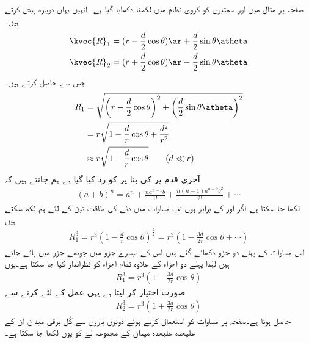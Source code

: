 صفحہ  پر مثال  میں  اور
  سمتیوں کو کروی نظام میں لکھنا دکھایا گیا ہے۔ انہیں یہاں دوبارہ پیش کرتے ہیں۔
\begin{align*}
\kvec{R}_1 &=(r-\frac{d}{2}\cos\theta)\ar+\frac{d}{2}\sin\theta \atheta\\
\kvec{R}_2 &=(r+\frac{d}{2}\cos \theta )\ar-\frac{d}{2}\sin \theta \atheta
\end{align*}
جس سے  حاصل کرتے ہیں۔
\begin{gather}
\begin{aligned}\label{مساوات_توانائی_جفت_قطب_فاصلے}
R_1&=\sqrt{\left(r-\frac{d}{2}\cos\theta\right)^2+\left(\frac{d}{2}\sin\theta \atheta \right)^2}\\
&=r \sqrt{1-\frac{d}{r} \cos \theta +\frac{d^2}{r^2}}\\
&\approx r \sqrt{1-\frac{d}{r} \cos \theta } \quad \quad (d \ll r)
\end{aligned}
\end{gather}
آخری قدم پر  کی بنا پر  کو رد کیا گیا ہے۔ہم جانتے ہیں کہ
\begin{align*}
(a+b)^n=a^n +\frac{n a^{n-1}b}{1!}+\frac{n(n-1)a^{n-2}b^2}{2!}+\cdots
\end{align*}
لکھا جا سکتا ہے۔اگر  اور  کے برابر ہوں تب مساوات  میں دئے  کی طاقت تین کے لئے ہم لکھ سکتے ہیں
\begin{align*}
R_1^3=r^3 (1-\tfrac{d}{r} \cos \theta)^{\frac{3}{2}}=r^3 \left( 1-\tfrac{3d}{2 r} \cos \theta+\cdots \right)
\end{align*}
اس مساوات کے پہلے دو جزو دکھائے گئے ہیں۔اس کے تیسرے جزو میں چوتھے جزو میں  پائے جاتے ہیں  لہٰذا پہلے دو اجزاء کے علاوہ تمام اجزاء کو نظرانداز کیا جا سکتا ہے۔یوں
\begin{align}
R_1^3=r^3 \left(1-\frac{3d}{2r} \cos \theta\right)
\end{align}
صورت اختیار کر لیتا ہے۔یہی عمل  کے لئے کرنے سے
\begin{align}
R_2^3=r^3 \left(1+\frac{3d}{2r} \cos \theta\right)
\end{align}
حاصل ہوتا ہے۔صفحہ  پر مساوات  کو استعمال کرتے ہوئے دونوں باروں سے کُل برقی میدان ان کے علیحدہ علیحدہ میدان کے مجموعہ لے کو یوں لکھا جا سکتا ہے۔
